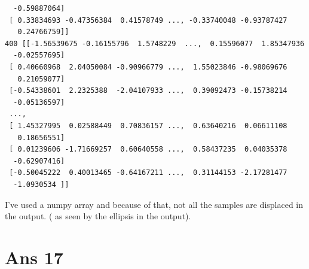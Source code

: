 \documentclass[10pt]{article}
\begin{document}
\begin{flushleft}
\begin{lstlisting}
  -0.59887064]
 [ 0.33834693 -0.47356384  0.41578749 ..., -0.33740048 -0.93787427
   0.24766759]]
400 [[-1.56539675 -0.16155796  1.5748229  ...,  0.15596077  1.85347936
  -0.02557695]
 [ 0.40660968  2.04050084 -0.90966779 ...,  1.55023846 -0.98069676
   0.21059077]
 [-0.54338601  2.2325388  -2.04107933 ...,  0.39092473 -0.15738214
  -0.05136597]
 ..., 
 [ 1.45327995  0.02588449  0.70836157 ...,  0.63640216  0.06611108
   0.18656551]
 [ 0.01239606 -1.71669257  0.60640558 ...,  0.58437235  0.04035378
  -0.62907416]
 [-0.50045222  0.40013465 -0.64167211 ...,  0.31144153 -2.17281477
  -1.0930534 ]]
\end{lstlisting}
I've used a numpy array and because of that, not all the samples are displaced in the output. ( as seen by the ellipsis in the output).
\end{flushleft}
\section*{Ans 17}
\end{document}
